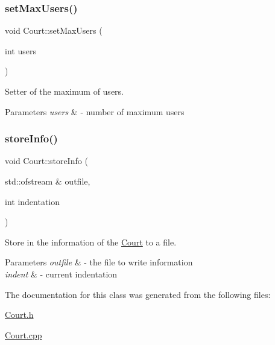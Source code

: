 \subsubsection{\texorpdfstring{set\+Max\+Users()}{setMaxUsers()}}
{\footnotesize\ttfamily void Court\+::set\+Max\+Users (\begin{DoxyParamCaption}\item[{int}]{users }\end{DoxyParamCaption})}



Setter of the maximum of users. 


\begin{DoxyParams}{Parameters}
{\em users} & -\/ number of maximum users \\
\hline
\end{DoxyParams}
\mbox{\label{class_court_a25104f6ccd6fea2d3a33798f2e30451e}} 
\subsubsection{\texorpdfstring{store\+Info()}{storeInfo()}}
{\footnotesize\ttfamily void Court\+::store\+Info (\begin{DoxyParamCaption}\item[{std\+::ofstream \&}]{outfile,  }\item[{int}]{indentation }\end{DoxyParamCaption})}



Store in the information of the \mbox{\hyperlink{class_court}{Court}} to a file. 


\begin{DoxyParams}{Parameters}
{\em outfile} & -\/ the file to write information \\
\hline
{\em indent} & -\/ current indentation \\
\hline
\end{DoxyParams}


The documentation for this class was generated from the following files\+:\begin{DoxyCompactItemize}
\item 
\mbox{\hyperlink{_court_8h}{Court.\+h}}\item 
\mbox{\hyperlink{_court_8cpp}{Court.\+cpp}}\end{DoxyCompactItemize}
